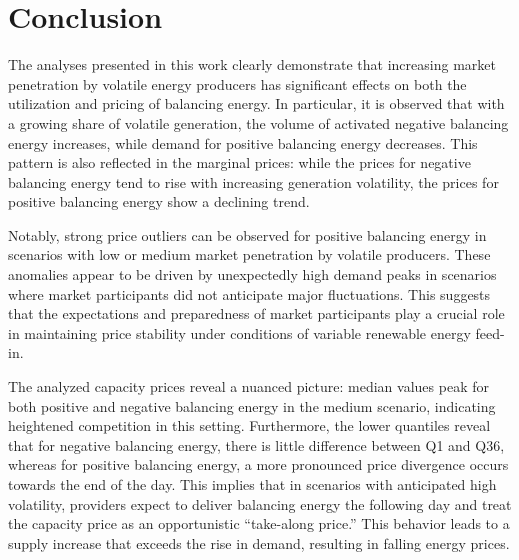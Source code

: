 \chapter{Conclusion}


The analyses presented in this work clearly demonstrate that increasing market penetration by volatile energy producers
has significant effects on both the utilization and pricing of balancing energy. In particular,
it is observed that with a growing share of volatile generation, the volume of activated negative balancing energy increases,
while demand for positive balancing energy decreases. This pattern is also reflected in the marginal prices: while the prices
for negative balancing energy tend to rise with increasing generation volatility, the prices for positive balancing energy show
a declining trend.

Notably, strong price outliers can be observed for positive balancing energy in scenarios with low or medium market penetration
by volatile producers. These anomalies appear to be driven by unexpectedly high demand peaks in scenarios where market participants
did not anticipate major fluctuations. This suggests that the expectations and preparedness of market participants play a crucial
role in maintaining price stability under conditions of variable renewable energy feed-in.

The analyzed capacity prices reveal a nuanced picture: median values peak for both positive and negative balancing energy
in the medium scenario, indicating heightened competition in this setting.
Furthermore, the lower quantiles reveal that for
negative balancing energy, there is little difference between Q1 and Q36, whereas for positive balancing energy,
a more pronounced price divergence occurs towards the end of the day. This implies that in scenarios with anticipated high volatility,
providers expect to deliver balancing energy the following day and treat the capacity price as an opportunistic “take-along price.”
This behavior leads to a supply increase that exceeds the rise in demand, resulting in falling energy prices.

